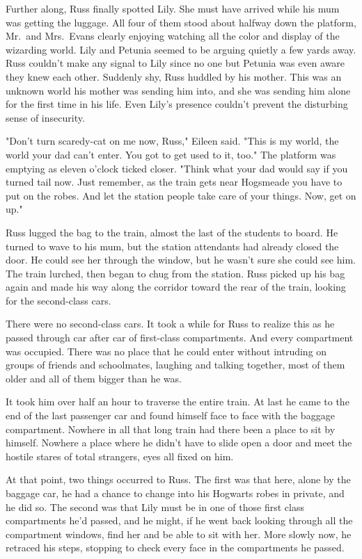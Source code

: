 Further along, Russ finally spotted Lily. She must have arrived while his mum was getting the luggage. All four of them stood about halfway down the platform, Mr.~and Mrs.~Evans clearly enjoying watching all the color and display of the wizarding world. Lily and Petunia seemed to be arguing quietly a few yards away. Russ couldn't make any signal to Lily since no one but Petunia was even aware they knew each other. Suddenly shy, Russ huddled by his mother. This was an unknown world his mother was sending him into, and she was sending him alone for the first time in his life. Even Lily's presence couldn't prevent the disturbing sense of insecurity.

"Don't turn scaredy-cat on me now, Russ," Eileen said. "This is my world, the world your dad can't enter. You got to get used to it, too." The platform was emptying as eleven o'clock ticked closer. "Think what your dad would say if you turned tail now. Just remember, as the train gets near Hogsmeade you have to put on the robes. And let the station people take care of your things. Now, get on up."

Russ lugged the bag to the train, almost the last of the students to board. He turned to wave to his mum, but the station attendants had already closed the door. He could see her through the window, but he wasn't sure she could see him. The train lurched, then began to chug from the station. Russ picked up his bag again and made his way along the corridor toward the rear of the train, looking for the second-class cars.

There were no second-class cars. It took a while for Russ to realize this as he passed through car after car of first-class compartments. And every compartment was occupied. There was no place that he could enter without intruding on groups of friends and schoolmates, laughing and talking together, most of them older and all of them bigger than he was.

It took him over half an hour to traverse the entire train. At last he came to the end of the last passenger car and found himself face to face with the baggage compartment. Nowhere in all that long train had there been a place to sit by himself. Nowhere a place where he didn't have to slide open a door and meet the hostile stares of total strangers, eyes all fixed on him.

At that point, two things occurred to Russ. The first was that here, alone by the baggage car, he had a chance to change into his Hogwarts robes in private, and he did so. The second was that Lily must be in one of those first class compartments he'd passed, and he might, if he went back looking through all the compartment windows, find her and be able to sit with her. More slowly now, he retraced his steps, stopping to check every face in the compartments he passed.

